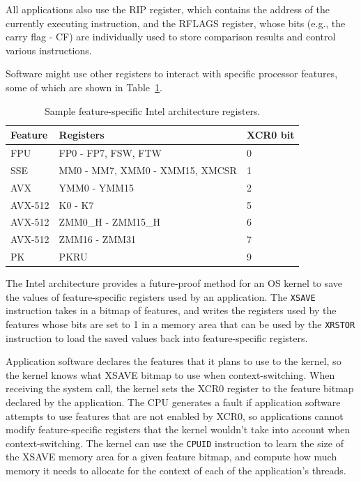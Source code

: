 All applications also use the RIP register, which contains the address of the
currently executing instruction, and the RFLAGS register, whose bits (e.g.,
the carry flag - CF) are individually used to store comparison results and
control various instructions.


Software might use other registers to interact with specific processor
features, some of which are shown in Table~\ref{fig:xsave_state}.

\begin{table}[hbt]
  \centering
  \begin{tabularx}{\columnwidth}{| l | X | l |}
  \hline
  \textbf{Feature} & \textbf{Registers} & \textbf{XCR0 bit}\\
  \hline
  FPU & FP0 - FP7, FSW, FTW & 0 \\
  \hline
  SSE & MM0 - MM7, XMM0 - XMM15, XMCSR & 1 \\
  \hline
  AVX & YMM0 - YMM15 & 2 \\
  \hline
  AVX-512 & K0 - K7 & 5 \\
  \hline
  AVX-512 & ZMM0\_H  - ZMM15\_H & 6 \\
  \hline
  AVX-512 & ZMM16 - ZMM31 & 7 \\
  \hline
  PK & PKRU & 9 \\
  \hline
  \end{tabularx}
  \caption{Sample feature-specific Intel architecture registers.}
  \label{fig:xsave_state}
\end{table}

The Intel architecture provides a future-proof method for an OS kernel to save
the values of feature-specific registers used by an application. The
\texttt{XSAVE} instruction takes in a bitmap of features, and writes the
registers used by the features whose bits are set to 1 in a memory area that
can be used by the \texttt{XRSTOR} instruction to load the saved values back
into feature-specific registers.

Application software declares the features that it plans to use to the kernel,
so the kernel knows what XSAVE bitmap to use when context-switching. When
receiving the system call, the kernel sets the XCR0 register to the feature
bitmap declared by the application. The CPU generates a fault if application
software attempts to use features that are not enabled by XCR0, so applications
cannot modify feature-specific registers that the kernel wouldn't take into
account when context-switching. The kernel can use the \texttt{CPUID}
instruction to learn the size of the XSAVE memory area for a given feature
bitmap, and compute how much memory it needs to allocate for the context of
each of the application's threads.
